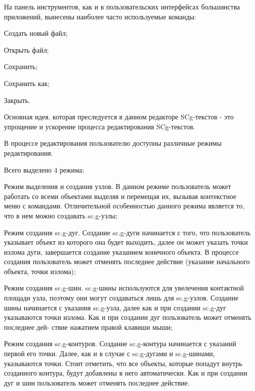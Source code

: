 На панель инструментов, как и в пользовательских интерфейсах большинства приложений, вынесены наиболее часто используемые команды:
\begin{textitemize}
\item Создать новый файл;
\item Открыть файл;
\item Сохранить;
\item Сохранить как;
\item Закрыть.
\end{textitemize}

Основная идея, которая преследуется в данном редакторе SCg-текстов - это упрощение и ускорение процесса редактирования SCg-текстов.

В процессе редактирования пользователю доступны различные режимы редактирования.

Всего выделено 4 режима:
\begin{textitemize}
\item Режим выделения и создания узлов.
В данном режиме пользователь может работать со всеми объектами выделяя и перемещая их, вызывая контекстное меню с командами.
Отличительной особенностью данного режима является то, что в нем можно создавать sc.g-узлы;

\item Режим создания sc.g-дуг.
Создание sc.g-дуги начинается с того, что пользователь указывает объект из которого она будет выходить, далее он может указать точки излома дуги, завершается создание указанием конечного объекта.
В процессе создания пользователь может отменять последнее действие (указание начального объекта, точки излома);

\item Режим создания sc.g-шин.
sc.g-шины используются для увелечения контактной площади узла, поэтому они могут создаваться лишь для sc.g-узлов. 
Создание шины начинается с указания sc.g-узла, далее как и при создании sc.g-дуг указываются точки излома. 
Как и при создании дуг пользователь может отменять последнее дей-
ствие нажатием правой клавиши мыши;

\item Режим создания sc.g-контуров.
Создание sc.g-контура начинается с указаний первой его точки. Далее, как и в случае с sc.g-дугами и sc.g-шинами, указываются точки.
Стоит отметить, что все объекты, которые попадут внутрь созданного
контура, будут добавлены в него автоматически.
Как и при создании дуг и шин пользователь может отменять последнее действие.
\end{textitemize}

